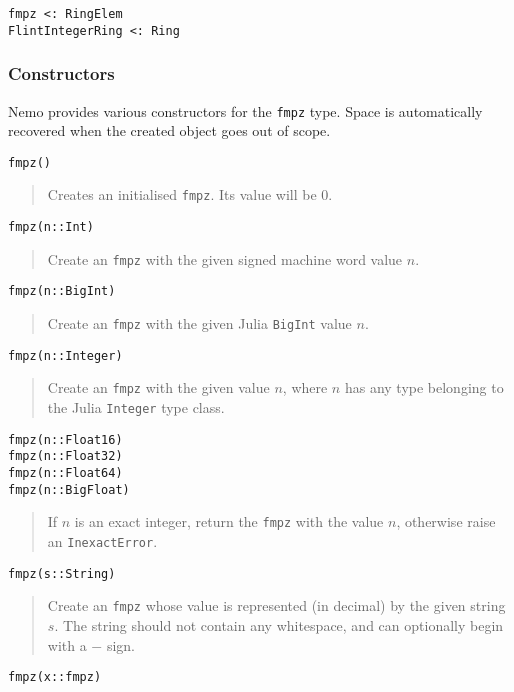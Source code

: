 \documentclass[a4paper,10pt]{article}
\newcommand{\code}{\lstinline}
\newcommand{\desc}[1]{\vspace{-3mm}\begin{quote}#1\end{quote}}
\begin{document}
\begin{lstlisting}
fmpz <: RingElem
FlintIntegerRing <: Ring
\end{lstlisting}

\subsubsection{Constructors}

Nemo provides various constructors for the \code{fmpz} type. Space is automatically
recovered when the created object goes out of scope.

\begin{lstlisting}
fmpz()
\end{lstlisting}

\desc{Creates an initialised \code{fmpz}. Its value will be $0$.}

\begin{lstlisting}
fmpz(n::Int)
\end{lstlisting}

\desc{Create an \code{fmpz} with the given signed machine word value $n$.}

\begin{lstlisting}
fmpz(n::BigInt)
\end{lstlisting}

\desc{Create an \code{fmpz} with the given Julia \code{BigInt} value $n$.}

\begin{lstlisting}
fmpz(n::Integer)
\end{lstlisting}

\desc{Create an \code{fmpz} with the given value $n$, where $n$ has any type belonging to the Julia
\code{Integer} type class.}

\begin{lstlisting}
fmpz(n::Float16)
fmpz(n::Float32)
fmpz(n::Float64)
fmpz(n::BigFloat)
\end{lstlisting}

\desc{If $n$ is an exact integer, return the \code{fmpz} with the value $n$, otherwise raise an
\code{InexactError}.}

\begin{lstlisting}
fmpz(s::String)
\end{lstlisting}

\desc{Create an \code{fmpz} whose value is represented (in decimal) by the given string
$s$. The string should not contain any whitespace, and can optionally begin with
a $-$ sign.}

\begin{lstlisting}
fmpz(x::fmpz)
\end{lstlisting}
\end{document}
